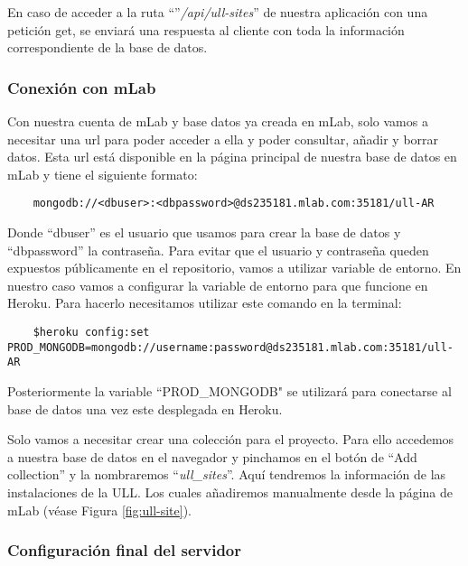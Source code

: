  
En caso de acceder a la ruta ``''\textit{/api/ull-sites}'' de nuestra aplicación con una petición get, se enviará una respuesta al cliente con toda la información correspondiente de la base de datos.

\subsubsection{Conexión con mLab}

Con nuestra cuenta de mLab y base datos ya creada en mLab, solo vamos a necesitar una url para poder acceder a ella y poder consultar, añadir y borrar datos. Esta url está disponible en la página principal de nuestra base de datos en mLab y tiene el siguiente formato:

\begin{lstlisting}
    mongodb://<dbuser>:<dbpassword>@ds235181.mlab.com:35181/ull-AR
\end{lstlisting}

Donde ``dbuser'' es el usuario que usamos para crear la base de datos y ``dbpassword'' la contraseña. Para evitar que el usuario y contraseña queden expuestos públicamente en el repositorio, vamos a utilizar variable de entorno. En nuestro caso vamos a configurar la variable de entorno para que funcione en Heroku. Para hacerlo necesitamos utilizar este comando en la terminal:

\begin{lstlisting}
    $heroku config:set PROD_MONGODB=mongodb://username:password@ds235181.mlab.com:35181/ull-AR
\end{lstlisting}

Posteriormente la variable ``PROD\_MONGODB" se utilizará para conectarse al base de datos una vez este desplegada en Heroku.

Solo vamos a necesitar crear una colección para el proyecto. Para ello accedemos a nuestra base de datos en el navegador y pinchamos en el botón de ``Add collection'' y la nombraremos ``\textit{ull\_sites}''. Aquí tendremos la información de las instalaciones de la ULL. Los cuales añadiremos manualmente desde la página de mLab (véase Figura \ref{fig:ull-site}).



\subsubsection{Configuración final del servidor}

